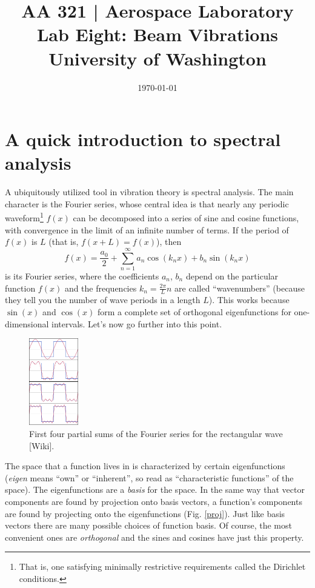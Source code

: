 \documentclass[12pt]{article}
\begin{document}
\title{\Large {\bf AA 321 | Aerospace Laboratory\\Lab Eight: Beam Vibrations}\\[1ex]
  University of Washington}
\date{\today}
\maketitle

\section{A quick introduction to spectral analysis}\label{objs}
A ubiquitously utilized tool in vibration theory is spectral analysis. The main character is the Fourier series, whose central idea is that nearly any periodic waveform\footnote{That is, one satisfying minimally restrictive requirements called the Dirichlet conditions.} $f(x)$ can be decomposed into a series of sine and cosine functions, with convergence in the limit of an infinite number of terms. If the period of $f(x)$ is $L$ (that is, $f(x+L) = f(x)$), then
\begin{equation}
  f(x) = \frac{a_0}{2} + \sum_{n=1}^\infty a_n\cos(k_nx) + b_n\sin(k_nx)\label{fourier}
\end{equation}
is its Fourier series, where the coefficients $a_n$, $b_n$ depend on the particular function $f(x)$ and the frequencies $k_n=\frac{2\pi}{L}n$ are called ``wavenumbers'' (because they tell you the number of wave periods in a length $L$). This works because $\sin(x)$ and $\cos(x)$ form a complete set of orthogonal eigenfunctions for one-dimensional intervals. Let's now go further into this point.
\begin{figure}[h]
  \centering
  \includegraphics[width=0.19\textwidth]{fex}
  \caption{First four partial sums of the Fourier series for the rectangular wave [Wiki].}
\end{figure}
\newpage
The space that a function lives in is characterized by certain eigenfunctions (\textit{eigen} means ``own'' or ``inherent'', so read as ``characteristic functions'' of the space). The eigenfunctions are a \textit{basis} for the space. In the same way that vector components are found by projection onto basis vectors, a function's components are found by projecting onto the eigenfunctions (Fig. \ref{proj}). Just like basis vectors there are many possible choices of function basis. Of course, the most convenient ones are \textit{orthogonal} and the sines and cosines have just this property.
\end{document}
